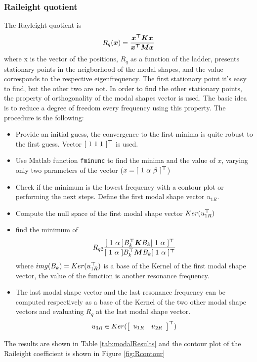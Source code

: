 \documentclass[twosided,a4paper]{article}           %
\newcommand{\tr}{^{\tiny{\bm \top}}}
\begin{document}
\subsubsection{Raileight quotient}
	The Rayleight quotient is 
	\begin{equation}
		R_q(\bm x) = \dfrac{\bm x\tr \bm K \bm x}{\bm x\tr \bm M \bm x} 
	\end{equation}
	where x is the vector of the positions, $R_q$ as a function of the ladder, presents stationary points in the neigborhood of the modal shapes, and the value corresponds to the respective eigenfrequency. The first stationary point it's easy to find, but the other two are not. In order to find the other stationary points, the property of orthogonality of the modal shapes vector is used. The basic idea is to reduce a degree of freedom every frequency using this property. The procedure is the following:
	\begin{itemize}
		\item Provide an initial guess, the convergence to the first minima is quite robust to the first guess. Vector $[\ 1 \ 1 \ 1 \ ]\tr$ is used.
		\item Use Matlab function \texttt{fminunc} to find the minima and the value of $x$, varying only two parameters of the vector ($x = [\ 1 \ \alpha \  \beta\ ]\tr$) 
		\item Check if the minimum is the lowest frequency with a contour plot or performing the next steps. Define the first modal shape vector $u_{1R}$.  
		\item Compute the null space of the first modal shape vector $Ker(u_{1R}\tr) $
		\item find the minimum of
		\begin{equation}
			R_{q2}\dfrac{[ \ 1 \ \alpha \ ] B_k\tr \bm K B_k [ \ 1 \ \alpha \ ]\tr}{[ \ 1 \ \alpha \ ] B_k\tr \bm M B_k [ \ 1 \ \alpha \ ]\tr}
		\label{eq:rq2}
		\end{equation}
		where $img(B_k) = Ker(u_{1R}\tr)$ is a base of the Kernel of the first modal shape vector, the value of the function is another resonance frequency.
		\item The last modal shape vector and the last resonance frequency can be computed respectively as a base of the Kernel of the two other modal shape vectors and evaluating $R_q$ at the last modal shape vector.
		\begin{equation}
			u_{3R} \in Ker(\left [
			\begin{array}{cc}
			u_{1R} &  u_{2R}
			\end{array} \right ]\tr)
		\end{equation}
	\end{itemize}
The results are shown in Table \ref{tab:modalResults} and the contour plot of the Raileight coefficient is shown in Figure \ref{fig:Rcontour}
\end{document}
